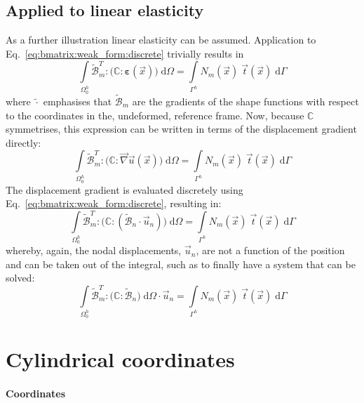 \documentclass[times,namecite]{goose-article}
\begin{document}
\subsection{Applied to linear elasticity}

As a further illustration linear elasticity can be assumed. Application to Eq.~\eqref{eq:bmatrix:weak_form:discrete} trivially results in
\begin{equation}
  \int\limits_{\Omega_0^h}
    \tilde{\mathcal{B}}_m^T : \Big( \mathbb{C} : \bm{\varepsilon}(\vec{x}) \Big) \;
  \mathrm{d}\Omega
  =
  \int\limits_{\Gamma^h}
    N_m(\vec{x}) \; \vec{t}(\vec{x}) \;
  \mathrm{d}\Gamma
\end{equation}
where $\tilde{\cdot}$ emphasises that $\tilde{\mathcal{B}}_m$ are the gradients of the shape functions with respect to the coordinates in the, undeformed, reference frame. Now, because $\mathbb{C}$ symmetrises, this expression can be written in terms of the displacement gradient directly:
\begin{equation}
  \int\limits_{\Omega_0^h}
    \tilde{\mathcal{B}}_m^T : \Big( \mathbb{C} : \vec{\nabla}\vec{u}(\vec{x}) \Big) \;
  \mathrm{d}\Omega
  =
  \int\limits_{\Gamma^h}
    N_m(\vec{x}) \; \vec{t}(\vec{x}) \;
  \mathrm{d}\Gamma
\end{equation}
The displacement gradient is evaluated discretely using Eq.~\eqref{eq:bmatrix:weak_form:discrete}, resulting in:
\begin{equation}
  \int\limits_{\Omega_0^h}
    \tilde{\mathcal{B}}_m^T : \Big( \mathbb{C} : ( \tilde{\mathcal{B}}_n \cdot \vec{u}_n) \Big) \;
  \mathrm{d}\Omega
  =
  \int\limits_{\Gamma^h}
    N_m(\vec{x}) \; \vec{t}(\vec{x}) \;
  \mathrm{d}\Gamma
\end{equation}
whereby, again, the nodal displacements, $\vec{u}_n$, are not a function of the position and can be taken out of the integral, such as to finally have a system that can be solved:
\begin{equation}
  \int\limits_{\Omega_0^h}
    \tilde{\mathcal{B}}_m^T : \Big( \mathbb{C} : \tilde{\mathcal{B}}_n \Big) \;
  \mathrm{d}\Omega
  \cdot \vec{u}_n
  =
  \int\limits_{\Gamma^h}
    N_m(\vec{x}) \; \vec{t}(\vec{x}) \;
  \mathrm{d}\Gamma
\end{equation}

\section{Cylindrical coordinates}

\paragraph{Coordinates}
\end{document}

